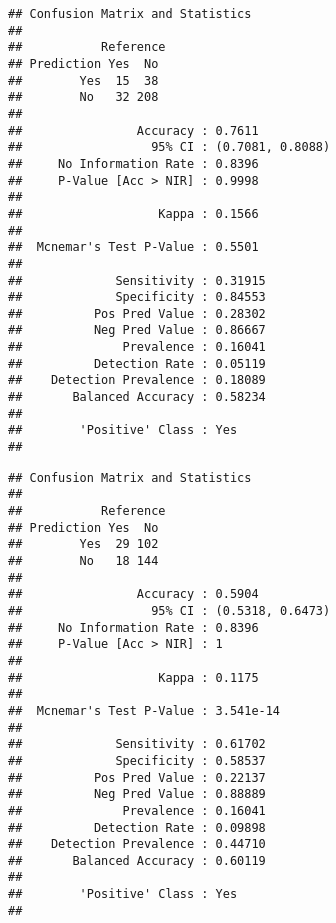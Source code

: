 \documentclass[
]{article}
\newenvironment{Shaded}{\begin{snugshade}}{\end{snugshade}}
\newcommand{\DataTypeTok}[1]{\textcolor[rgb]{0.13,0.29,0.53}{#1}}
\newcommand{\KeywordTok}[1]{\textcolor[rgb]{0.13,0.29,0.53}{\textbf{#1}}}
\newcommand{\NormalTok}[1]{#1}
\newcommand{\OperatorTok}[1]{\textcolor[rgb]{0.81,0.36,0.00}{\textbf{#1}}}
\newcommand{\StringTok}[1]{\textcolor[rgb]{0.31,0.60,0.02}{#1}}
\begin{document}
\begin{Shaded}
\end{Shaded}

\begin{verbatim}
## Confusion Matrix and Statistics
## 
##           Reference
## Prediction Yes  No
##        Yes  15  38
##        No   32 208
##                                           
##                Accuracy : 0.7611          
##                  95% CI : (0.7081, 0.8088)
##     No Information Rate : 0.8396          
##     P-Value [Acc > NIR] : 0.9998          
##                                           
##                   Kappa : 0.1566          
##                                           
##  Mcnemar's Test P-Value : 0.5501          
##                                           
##             Sensitivity : 0.31915         
##             Specificity : 0.84553         
##          Pos Pred Value : 0.28302         
##          Neg Pred Value : 0.86667         
##              Prevalence : 0.16041         
##          Detection Rate : 0.05119         
##    Detection Prevalence : 0.18089         
##       Balanced Accuracy : 0.58234         
##                                           
##        'Positive' Class : Yes             
## 
\end{verbatim}

\begin{Shaded}
\end{Shaded}

\begin{verbatim}
## Confusion Matrix and Statistics
## 
##           Reference
## Prediction Yes  No
##        Yes  29 102
##        No   18 144
##                                           
##                Accuracy : 0.5904          
##                  95% CI : (0.5318, 0.6473)
##     No Information Rate : 0.8396          
##     P-Value [Acc > NIR] : 1               
##                                           
##                   Kappa : 0.1175          
##                                           
##  Mcnemar's Test P-Value : 3.541e-14       
##                                           
##             Sensitivity : 0.61702         
##             Specificity : 0.58537         
##          Pos Pred Value : 0.22137         
##          Neg Pred Value : 0.88889         
##              Prevalence : 0.16041         
##          Detection Rate : 0.09898         
##    Detection Prevalence : 0.44710         
##       Balanced Accuracy : 0.60119         
##                                           
##        'Positive' Class : Yes             
## 
\end{verbatim}
\end{document}
